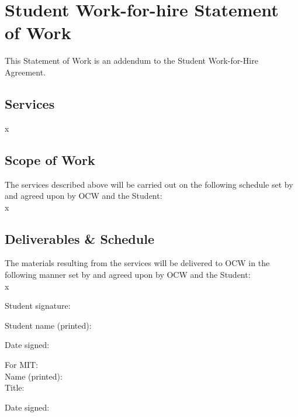 \documentclass{article}
\begin{document}


\break
\section*{Student Work-for-hire Statement of Work}
This Statement of Work is an addendum to the Student Work-for-Hire Agreement.

\subsection*{Services}
{x}

\subsection*{Scope of Work}
The services described above will be carried out on the following schedule set by and agreed upon by OCW and the Student: \\
{x}

\subsection*{Deliverables \& Schedule}
The materials resulting from the services will be delivered to OCW in the following manner set by and agreed upon by OCW and the Student: \\
{x}

\vspace{0.5cm}
\begin{tcolorbox}[colback=black!0!white,colframe=black!75!black, boxrule = 0pt, frame hidden, sharpish corners]
\vspace{0.7cm}
Student signature: \makebox[7cm]{\hrulefill}

\vspace{0.7cm}
Student name (printed): \makebox[6cm]{\hrulefill}

\vspace{0.7cm}
Date signed: \makebox[8cm]{\hrulefill}
\end{tcolorbox}

\begin{tcolorbox}[colback=black!5!white,colframe=black!75!black, sharpish corners,title=FOR OCW USE ONLY]
\vspace{0.7cm}
For MIT: \makebox[8cm]{\hrulefill} \\

\vspace{0.7cm}
Name (printed): \makebox[7cm]{\hrulefill} \\

\vspace{0.7cm}
Title: \makebox[9cm]{\hrulefill}

\vspace{0.7cm}
Date signed: \makebox[8cm]{\hrulefill}
\end{tcolorbox}
\end{document}
